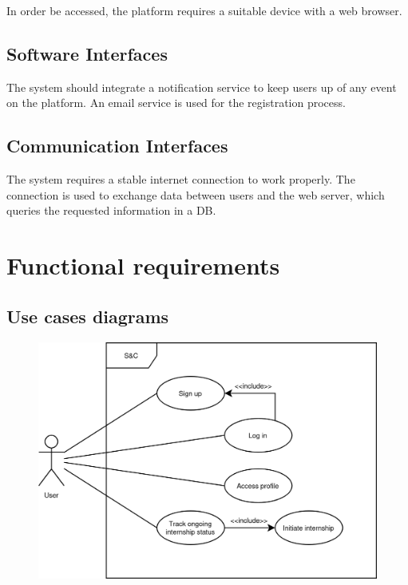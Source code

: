 In order be accessed, the platform requires a suitable device with a web browser.

\subsection{Software Interfaces}

The system should integrate a notification service to keep users up of any event on the platform.
An email service is used for the registration process.

\subsection{Communication Interfaces}

The system requires a stable internet connection to work properly.
The connection is used to exchange data between users and the web server, which queries the requested information in a DB.

\section{Functional requirements}

\subsection{Use cases diagrams}

\begin{figure}[H]
    \centering
    \includegraphics[width=0.3\linewidth]{../../assets/use-case-diagrams/user-common.png}
\end{figure}

